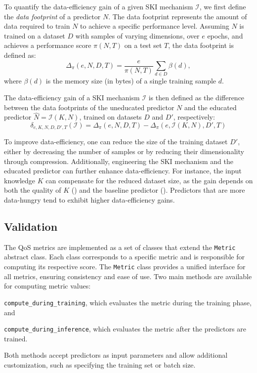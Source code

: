 %
To quantify the data-efficiency gain of a given \gls{SKI} mechanism \(\mathcal{I}\), we first define the \emph{data footprint} of a predictor \(N\).
%
The data footprint represents the amount of data required to train \(N\) to achieve a specific performance level.
%
Assuming \(N\) is trained on a dataset \(D\) with samples of varying dimensions, over \(e\) epochs, and achieves a performance score \(\pi(N, T)\) on a test set \(T\), the data footprint is defined as:
%
\begin{equation}
    \label{eq:data-footprint}
    \Delta_\pi(e, N, D, T) = \frac{e}{\pi(N, T)} \sum_{d \in D} \beta(d),
\end{equation}
%
where \(\beta(d)\) is the memory size (in bytes) of a single training sample \(d\).

%
The data-efficiency gain of a \gls{SKI} mechanism \(\mathcal{I}\) is then defined as the difference between the data footprints of the uneducated predictor \(N\) and the educated predictor \(\hat{N} = \mathcal{I}(K, N)\), trained on datasets \(D\) and \(D'\), respectively:
%
\begin{equation}
    \label{eq:data-efficiency-gain}
    \delta_{e, K, N, D, D', T}(\mathcal{I}) = \Delta_\pi(e, N, D, T) - \Delta_\pi(e, \mathcal{I}(K, N), D', T)
\end{equation}

%
To improve data-efficiency, one can reduce the size of the training dataset \(D'\), either by decreasing the number of samples or by reducing their dimensionality through compression.
%
Additionally, engineering the \gls{SKI} mechanism and the educated predictor can further enhance data-efficiency.
%
For instance, the input knowledge \(K\) can compensate for the reduced dataset size, as the gain depends on both the quality of \(K\) () and the baseline predictor ().
%
Predictors that are more data-hungry tend to exhibit higher data-efficiency gains.


\subsection{Validation}\label{subsec:ski-meets-intelligent-agents-validation}
%
The \gls{QoS} metrics are implemented as a set of classes that extend the \texttt{Metric} abstract class.
%
Each class corresponds to a specific metric and is responsible for computing its respective score.
%
The \texttt{Metric} class provides a unified interface for all metrics, ensuring consistency and ease of use.
%
Two main methods are available for computing metric values:
%
\begin{inlinelist}
    \item \texttt{compute\_during\_training}, which evaluates the metric during the training phase, and
    \item \texttt{compute\_during\_inference}, which evaluates the metric after the predictors are trained.
\end{inlinelist}
%
Both methods accept predictors as input parameters and allow additional customization, such as specifying the training set or batch size.

